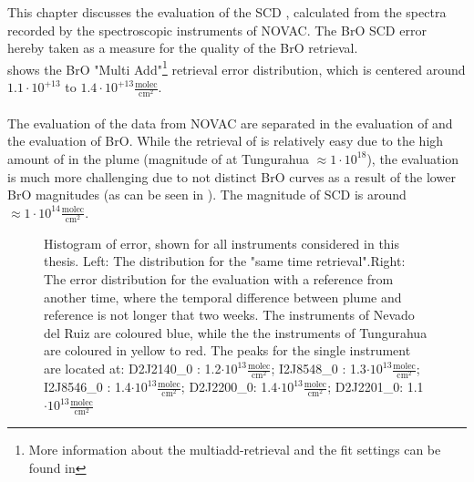 This chapter discusses the evaluation of the  SCD , calculated from the spectra recorded by the spectroscopic instruments of NOVAC. The BrO SCD error hereby taken as a measure for the quality of the BrO retrieval.\\
 shows the BrO "Multi Add"\footnote{More information about the multiadd-retrieval and the fit settings can be found in } retrieval error distribution, which is centered around $1.1\cdot10^{+13}$ to $1.4\cdot 10^{+13}\frac{\text{molec}}{\text{cm}^2}$. \\
\\
The evaluation of the data from NOVAC are separated in the evaluation of  and the evaluation of BrO. While the retrieval of  is relatively easy due to the high amount of  in the plume (magnitude of  at Tungurahua $\approx 1\cdot 10^{18}$), the  evaluation is much more challenging due to not distinct BrO curves as a result of the lower BrO magnitudes (as can be seen in ). The magnitude of  SCD is around $\approx 1\cdot 10^{14}\frac{\text{molec}}{\text{cm}^2}$. \\
%
\begin{figure}
	\caption[Histogram of  error, shown for all instruments considered in this thesis.]{Histogram of  error, shown for all instruments considered in this thesis. Left: The  distribution for the "same time retrieval".Right: The  error distribution for the evaluation with a reference from another time, where the temporal difference between plume and reference is not longer that two weeks. The instruments of Nevado del Ruiz are coloured blue, while the the instruments of Tungurahua are coloured in yellow to red.
		The peaks for the single instrument are located at: D2J2140\_0 : 1.2$\cdot 10^{13}\frac{\text{molec}}{\text{cm}^2}$; I2J8548\_0 : 1.3$\cdot 10^{13}\frac{\text{molec}}{\text{cm}^2}$;
		I2J8546\_0 : 1.4$\cdot 10^{13}\frac{\text{molec}}{\text{cm}^2}$;
		D2J2200\_0: 1.4$\cdot 10^{13}\frac{\text{molec}}{\text{cm}^2}$;
		D2J2201\_0: 1.1$\cdot 10^{13}\frac{\text{molec}}{\text{cm}^2}$}
	\label{fig:allbroerrordistribution}
\end{figure}

